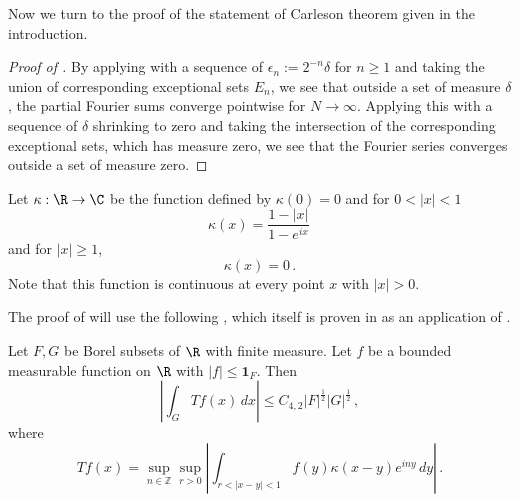 Now we turn to the proof of the statement of Carleson theorem given in the introduction.
\begin{proof}[Proof of ]
\leanok
By applying  with a sequence of $\epsilon_n:= 2^{-n}\delta$ for $n\ge 1$ and taking the union
of corresponding exceptional sets $E_n$, we see that outside a set of measure $\delta$, the partial Fourier
sums converge pointwise for $N\to \infty$. Applying this with a sequence of $\delta$ shrinking to zero and
taking the intersection of the corresponding exceptional sets, which has measure zero, we see that the Fourier
series converges outside a set of measure zero.
\end{proof}

Let $\kappa:\R\to \C$ be the function defined by
$\kappa(0)=0$ and for $0<|x|<1$
\begin{equation}\label{eq-hilker}
\kappa(x)=\frac { 1-|x|}{1-e^{ix}}\,
\end{equation}
and for $|x|\ge 1$,
\begin{equation}\label{eq-hilker1}
\kappa(x)=0\, .
\end{equation}
Note that this function is continuous at every point $x$ with $|x|>0$.

The proof of  will
use the following , which itself is proven
 in  as an application of
 .
\begin{lemma}\label{real-Carleson}
\leanok
{}
    Let $F,G$ be Borel subsets of $\R$ with finite measure. Let $f$ be a bounded measurable function on $\R$ with $|f|\le \mathbf{1}_F$. Then
\begin{equation}
    \left|\int _G Tf(x) \, dx\right| \le C_{4,2} |F|^{\frac 12} |G|^{\frac 12} \, ,
\end{equation}
where
\begin{equation}
    \label{define-T-carleson}
    T f(x)=\sup_{n\in \mathbb{Z}}
    \sup_{r>0}\left|\int_{r<|x-y|<1} f(y)\kappa(x-y) e^{iny}\, dy\right|\, .
\end{equation}
\end{lemma}


